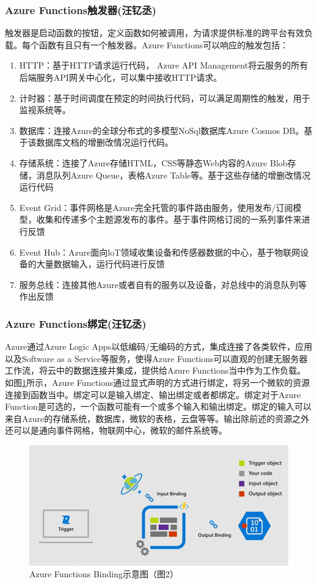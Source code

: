 \documentclass[11pt]{article}
\begin{document}
\subsubsection{Azure Functions触发器(汪钇丞)}
触发器是启动函数的按钮，定义函数如何被调用，为请求提供标准的跨平台有效负载。每个函数有且只有一个触发器。Azure Functions可以响应的触发包括：
\begin{enumerate}
    \item HTTP：基于HTTP请求运行代码， Azure API Management将云服务的所有后端服务API网关中心化，可以集中接收HTTP请求。
    \item 计时器：基于时间调度在预定的时间执行代码，可以满足周期性的触发，用于监视系统等。
    \item 数据库：连接Azure的全球分布式的多模型NoSql数据库Azure Cosmos DB。基于该数据库文档的增删改情况运行代码。
    \item 存储系统：连接了Azure存储HTML，CSS等静态Web内容的Azure Blob存储，消息队列Azure Queue，表格Azure Table等。基于这些存储的增删改情况运行代码
    \item Event Grid：事件网格是Azure完全托管的事件路由服务，使用发布/订阅模型，收集和传递多个主题源发布的事件。基于事件网格订阅的一系列事件来进行反馈
    \item Event Hub：Azure面向loT领域收集设备和传感器数据的中心，基于物联网设备的大量数据输入，运行代码进行反馈
    \item 服务总线：连接其他Azure或者自有的服务以及设备，对总线中的消息队列等作出反馈
\end{enumerate}
\subsubsection{Azure Functions绑定(汪钇丞)}
Azure通过Azure Logic Apps以低编码/无编码的方式，集成连接了各类软件，应用以及Software as a Service等服务，使得Azure Functions可以直观的创建无服务器工作流，将云中的数据连接并集成，提供给Azure Functions当中作为工作负载。如图\ref{figs:bind}所示，Azure Functions通过显式声明的方式进行绑定，将另一个微软的资源连接到函数当中。绑定可以是输入绑定、输出绑定或者都绑定。绑定对于Azure Function是可选的，一个函数可能有一个或多个输入和输出绑定。绑定的输入可以来自Azure的存储系统，数据库，微软的表格，云盘等等。输出除前述的资源之外还可以是通向事件网格，物联网中心，微软的邮件系统等。
\begin{figure}[!htbp]
	\centering
	\includegraphics[scale=0.5]{figs/AzureBindings.png}
	\caption{Azure Functions Binding示意图（\cite{binding}图2）}
	\label{figs:bind}
\end{figure}
\end{document}
